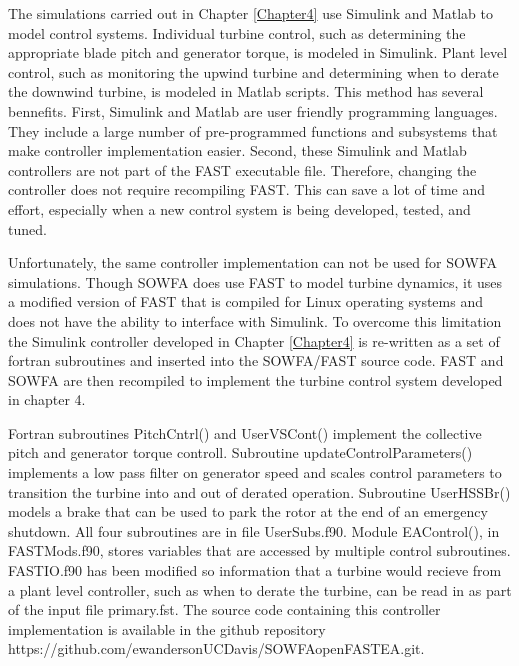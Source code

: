 The simulations carried out in Chapter \ref{Chapter4} use Simulink and Matlab to model control systems. Individual turbine control, such as determining the appropriate blade pitch and generator torque, is modeled in Simulink. Plant level control, such as monitoring the upwind turbine and determining when to derate the downwind turbine, is modeled in Matlab scripts. This method has several bennefits. First, Simulink and Matlab are user friendly programming languages.  They include a large number of pre-programmed functions and subsystems that make controller implementation easier. Second, these Simulink and Matlab controllers are not part of the FAST executable file. Therefore, changing the controller does not require recompiling FAST. This can save a lot of time and effort, especially when a new control system is being developed, tested, and tuned. 

Unfortunately, the same controller implementation can not be used for SOWFA simulations. Though SOWFA does use FAST to model turbine dynamics, it uses a modified version of FAST that is compiled for Linux operating systems and does not have the ability to interface with Simulink. To overcome this limitation the Simulink controller developed in Chapter \ref{Chapter4} is re-written as a set of fortran subroutines and inserted into the SOWFA/FAST source code. FAST and SOWFA are then recompiled to implement the turbine control system developed in chapter 4. 

Fortran subroutines PitchCntrl() and UserVSCont() implement the collective pitch and generator torque controll. Subroutine updateControlParameters() implements a low pass filter on generator speed and scales control parameters to transition the turbine into and out of derated operation. Subroutine UserHSSBr() models a brake that can be used to park the rotor at the end of an emergency shutdown. All four subroutines are in file UserSubs.f90. Module EAControl(), in FAST\textunderscore Mods.f90, stores variables that are accessed by multiple control subroutines. FAST\textunderscore IO.f90 has been modified so information that a turbine would recieve from a plant level controller, such as when to derate the turbine, can be read in as part of the input file primary.fst. The source code containing this controller implementation is available in the github repository https://github.com/ewandersonUCDavis/SOWFA\textunderscore openFAST\textunderscore EA.git.    

